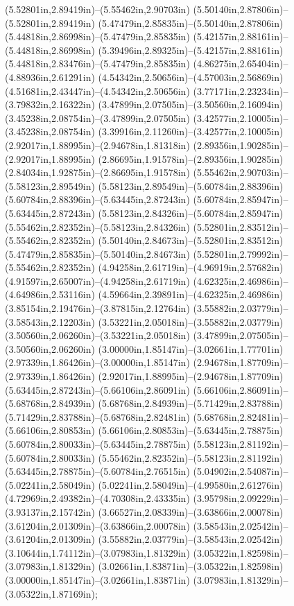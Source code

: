 (5.52801in,2.89419in)--(5.55462in,2.90703in) (5.50140in,2.87806in)--(5.52801in,2.89419in) (5.47479in,2.85835in)--(5.50140in,2.87806in) (5.44818in,2.86998in)--(5.47479in,2.85835in) (5.42157in,2.88161in)--(5.44818in,2.86998in) (5.39496in,2.89325in)--(5.42157in,2.88161in) (5.44818in,2.83476in)--(5.47479in,2.85835in) (4.86275in,2.65404in)--(4.88936in,2.61291in) (4.54342in,2.50656in)--(4.57003in,2.56869in) (4.51681in,2.43447in)--(4.54342in,2.50656in) (3.77171in,2.23234in)--(3.79832in,2.16322in) (3.47899in,2.07505in)--(3.50560in,2.16094in) (3.45238in,2.08754in)--(3.47899in,2.07505in) (3.42577in,2.10005in)--(3.45238in,2.08754in) (3.39916in,2.11260in)--(3.42577in,2.10005in) (2.92017in,1.88995in)--(2.94678in,1.81318in) (2.89356in,1.90285in)--(2.92017in,1.88995in) (2.86695in,1.91578in)--(2.89356in,1.90285in) (2.84034in,1.92875in)--(2.86695in,1.91578in) (5.55462in,2.90703in)--(5.58123in,2.89549in) (5.58123in,2.89549in)--(5.60784in,2.88396in) (5.60784in,2.88396in)--(5.63445in,2.87243in) (5.60784in,2.85947in)--(5.63445in,2.87243in) (5.58123in,2.84326in)--(5.60784in,2.85947in) (5.55462in,2.82352in)--(5.58123in,2.84326in) (5.52801in,2.83512in)--(5.55462in,2.82352in) (5.50140in,2.84673in)--(5.52801in,2.83512in) (5.47479in,2.85835in)--(5.50140in,2.84673in) (5.52801in,2.79992in)--(5.55462in,2.82352in) (4.94258in,2.61719in)--(4.96919in,2.57682in) (4.91597in,2.65007in)--(4.94258in,2.61719in) (4.62325in,2.46986in)--(4.64986in,2.53116in) (4.59664in,2.39891in)--(4.62325in,2.46986in) (3.85154in,2.19476in)--(3.87815in,2.12764in) (3.55882in,2.03779in)--(3.58543in,2.12203in) (3.53221in,2.05018in)--(3.55882in,2.03779in) (3.50560in,2.06260in)--(3.53221in,2.05018in) (3.47899in,2.07505in)--(3.50560in,2.06260in) (3.00000in,1.85147in)--(3.02661in,1.77701in) (2.97339in,1.86426in)--(3.00000in,1.85147in) (2.94678in,1.87709in)--(2.97339in,1.86426in) (2.92017in,1.88995in)--(2.94678in,1.87709in) (5.63445in,2.87243in)--(5.66106in,2.86091in) (5.66106in,2.86091in)--(5.68768in,2.84939in) (5.68768in,2.84939in)--(5.71429in,2.83788in) (5.71429in,2.83788in)--(5.68768in,2.82481in) (5.68768in,2.82481in)--(5.66106in,2.80853in) (5.66106in,2.80853in)--(5.63445in,2.78875in) (5.60784in,2.80033in)--(5.63445in,2.78875in) (5.58123in,2.81192in)--(5.60784in,2.80033in) (5.55462in,2.82352in)--(5.58123in,2.81192in) (5.63445in,2.78875in)--(5.60784in,2.76515in) (5.04902in,2.54087in)--(5.02241in,2.58049in) (5.02241in,2.58049in)--(4.99580in,2.61276in) (4.72969in,2.49382in)--(4.70308in,2.43335in) (3.95798in,2.09229in)--(3.93137in,2.15742in) (3.66527in,2.08339in)--(3.63866in,2.00078in) (3.61204in,2.01309in)--(3.63866in,2.00078in) (3.58543in,2.02542in)--(3.61204in,2.01309in) (3.55882in,2.03779in)--(3.58543in,2.02542in) (3.10644in,1.74112in)--(3.07983in,1.81329in) (3.05322in,1.82598in)--(3.07983in,1.81329in) (3.02661in,1.83871in)--(3.05322in,1.82598in) (3.00000in,1.85147in)--(3.02661in,1.83871in) (3.07983in,1.81329in)--(3.05322in,1.87169in);
